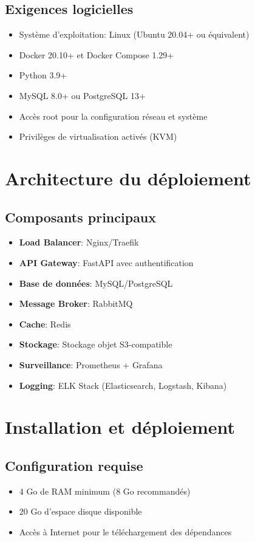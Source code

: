 \documentclass[12pt,a4paper]{report}
\begin{document}
\subsection{Exigences logicielles}
\begin{itemize}
    \item Système d'exploitation: Linux (Ubuntu 20.04+ ou équivalent)
    \item Docker 20.10+ et Docker Compose 1.29+
    \item Python 3.9+
    \item MySQL 8.0+ ou PostgreSQL 13+
    \item Accès root pour la configuration réseau et système
    \item Privilèges de virtualisation activés (KVM)
\end{itemize}

\section{Architecture du déploiement}
\subsection{Composants principaux}
\begin{itemize}
    \item \textbf{Load Balancer}: Nginx/Traefik
    \item \textbf{API Gateway}: FastAPI avec authentification
    \item \textbf{Base de données}: MySQL/PostgreSQL
    \item \textbf{Message Broker}: RabbitMQ
    \item \textbf{Cache}: Redis
    \item \textbf{Stockage}: Stockage objet S3-compatible
    \item \textbf{Surveillance}: Prometheus + Grafana
    \item \textbf{Logging}: ELK Stack (Elasticsearch, Logstash, Kibana)
\end{itemize}

\section{Installation et déploiement}
\subsection{Configuration requise}
\begin{itemize}
    \item 4 Go de RAM minimum (8 Go recommandés)
    \item 20 Go d'espace disque disponible
    \item Accès à Internet pour le téléchargement des dépendances
\end{itemize}
\end{document}
